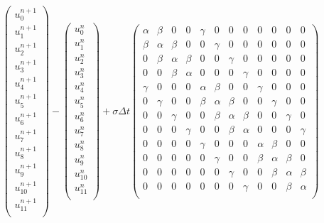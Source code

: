 \documentclass[11pt]{article}
\begin{document}
\setcounter{MaxMatrixCols}{12}
\begin{equation}
\left(
\begin{array}{c}
u^{n+1}_{0}\\
u^{n+1}_{1}\\
u^{n+1}_{2}\\
u^{n+1}_{3}\\
u^{n+1}_{4}\\
u^{n+1}_{5}\\
u^{n+1}_{6}\\
u^{n+1}_{7}\\
u^{n+1}_{8}\\
u^{n+1}_{9}\\
u^{n+1}_{10}\\
u^{n+1}_{11}\\
\end{array}
\right)
-
\left(
\begin{array}{c}
u^{n}_{0}\\
u^{n}_{1}\\
u^{n}_{2}\\
u^{n}_{3}\\
u^{n}_{4}\\
u^{n}_{5}\\
u^{n}_{6}\\
u^{n}_{7}\\
u^{n}_{8}\\
u^{n}_{9}\\
u^{n}_{10}\\
u^{n}_{11}\\
\end{array}
\right)
+ 
\sigma \Delta t 
\begin{pmatrix}
\alpha & \beta & 0 & 0 & \gamma & 0 & 0 & 0 & 0 & 0 & 0 & 0 \\
\beta & \alpha & \beta & 0 & 0 & \gamma & 0 & 0 & 0 & 0 & 0 & 0 \\
0 & \beta & \alpha & \beta & 0 & 0 & \gamma & 0 & 0 & 0 & 0 & 0 \\
0 & 0 & \beta & \alpha & 0 & 0 & 0 & \gamma & 0 & 0 & 0 & 0 \\
\gamma & 0 & 0 & 0 & \alpha & \beta & 0 & 0 & \gamma & 0 & 0 & 0 \\
0 & \gamma & 0 & 0 & \beta & \alpha & \beta & 0 & 0 & \gamma & 0 & 0 \\
0 & 0 & \gamma & 0 & 0 & \beta & \alpha & \beta & 0 & 0 & \gamma & 0 \\
0 & 0 & 0 & \gamma & 0 & 0 & \beta & \alpha & 0 & 0 & 0 & \gamma \\
0 & 0 & 0 & 0 & \gamma & 0 & 0 & 0 & \alpha & \beta & 0 & 0 \\
0 & 0 & 0 & 0 & 0 & \gamma & 0 & 0 & \beta & \alpha & \beta & 0 \\
0 & 0 & 0 & 0 & 0 & 0 & \gamma & 0 & 0 & \beta & \alpha & \beta \\
0 & 0 & 0 & 0 & 0 & 0 & 0 & \gamma & 0 & 0 & \beta & \alpha \\


\end{pmatrix}
\end{equation}
\end{document}
